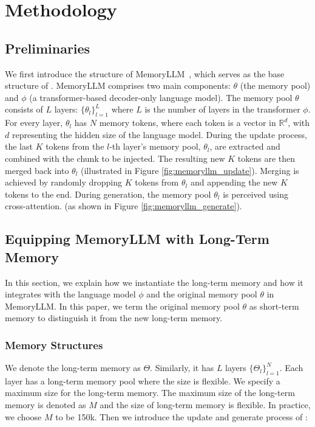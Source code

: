 \vspace{-5pt}
\section{Methodology}
\subsection{Preliminaries}
\label{sub:preliminary}
We first introduce the structure of MemoryLLM~\citep{memoryllm}, which serves as the base structure of \ours. 
MemoryLLM comprises two main components: $\theta$ (the memory pool) and $\phi$ (a transformer-based decoder-only language model). The memory pool $\theta$ consists of $L$ layers: $\{\theta_l\}_{l=1}^{L}$ where $L$ is the number of layers in the transformer $\phi$. For every layer, $\theta_l$ has $N$ memory tokens, where each token is a vector in $\mathbb{R}^{d}$, with $d$ representing the hidden size of the language model. During the update process, the last $K$ tokens from the $l$-th layer’s memory pool, $\theta_l$, are extracted and combined with the chunk to be injected. The resulting new $K$ tokens are then merged back into $\theta_l$ (illustrated in Figure \ref{fig:memoryllm_update}). Merging is achieved by randomly dropping $K$ tokens from $\theta_l$ and appending the new $K$ tokens to the end. 
During generation, the memory pool $\theta_l$ is perceived using cross-attention. (as shown in Figure \ref{fig:memoryllm_generate}). 



\vspace{-5pt}
\subsection{Equipping MemoryLLM with Long-Term Memory}
In this section, we explain how we instantiate the long-term memory
and how it integrates with the language model $\phi$ and the original memory pool $\theta$ in MemoryLLM. In this paper, we term the original memory pool $\theta$ as short-term memory to distinguish it from the new long-term memory. 

\vspace{-5pt}
\subsubsection{Memory Structures}
We denote the long-term memory as $\Theta$. Similarly, it has $L$ layers $\{\Theta_l\}_{l=1}^N$. Each layer has a long-term memory pool where the size is flexible. We specify a maximum size for the long-term memory. The maximum size of the long-term memory is denoted as $M$ and 
the size of long-term memory is flexible. In practice, we choose $M$ to be 150k. Then we introduce the update and generate process of \ours:


